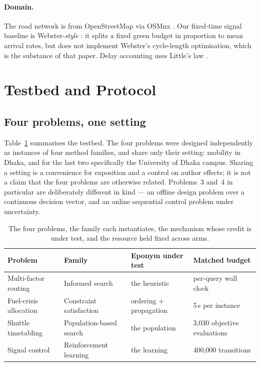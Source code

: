 \documentclass[11pt]{article}
\begin{document}
\paragraph{Domain.} The road network is from OpenStreetMap via OSMnx \citep{boeing2017osmnx}. Our fixed-time
signal baseline is Webster-\emph{style} \citep{webster1958traffic}: it splits a fixed green budget
in proportion to mean arrival rates, but does not implement Webster's cycle-length optimisation,
which is the substance of that paper. Delay accounting uses Little's law \citep{little1961proof}.

\section{Testbed and Protocol}
\label{sec:protocol}

\subsection{Four problems, one setting}

Table~\ref{tab:testbed} summarises the testbed. The four problems were designed independently as
instances of four method families, and share only their setting: mobility in Dhaka, and for the
last two specifically the University of Dhaka campus. Sharing a setting is a convenience for
exposition and a control on author effects; it is not a claim that the four problems are otherwise
related. Problems~3 and~4 in particular are deliberately different in kind --- an offline design
problem over a continuous decision vector, and an online sequential control problem under
uncertainty.

\begin{table}[t]
\centering
\small
\caption{The four problems, the family each instantiates, the mechanism whose credit is under test,
and the resource held fixed across arms.}
\label{tab:testbed}
\begin{tabular}{@{}llll@{}}
\toprule
\textbf{Problem} & \textbf{Family} & \textbf{Eponym under test} & \textbf{Matched budget} \\
\midrule
Multi-factor routing      & Informed search        & the heuristic        & per-query wall clock \\
Fuel-crisis allocation    & Constraint satisfaction& ordering + propagation & 5\,s per instance \\
Shuttle timetabling       & Population-based search& the population       & 3{,}030 objective evaluations \\
Signal control            & Reinforcement learning & the learning         & 400{,}000 transitions \\
\bottomrule
\end{tabular}
\end{table}
\end{document}
